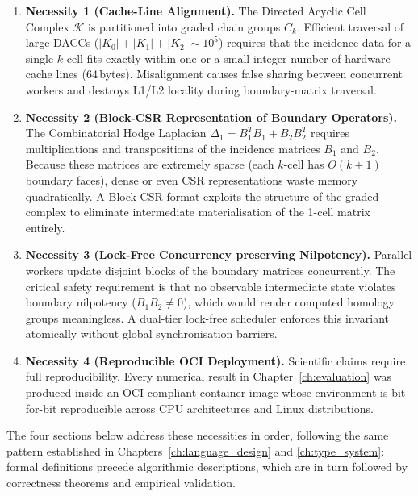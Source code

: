 \begin{enumerate}[leftmargin=1.5cm]
    \item \textbf{Necessity 1 (Cache-Line Alignment).}
          The Directed Acyclic Cell Complex $\mathcal{K}$ is partitioned into
          graded chain groups $C_k$.  Efficient traversal of large DACCs
          ($|K_0| + |K_1| + |K_2| \sim 10^5$) requires that the incidence
          data for a single $k$-cell fits exactly within one or a small
          integer number of hardware cache lines (64\,bytes).  Misalignment
          causes false sharing between concurrent workers and destroys
          L1/L2 locality during boundary-matrix traversal.

    \item \textbf{Necessity 2 (Block-CSR Representation of Boundary Operators).}
          The Combinatorial Hodge Laplacian
          $\Delta_1 = B_1^T B_1 + B_2 B_2^T$ requires multiplications and
          transpositions of the incidence matrices $B_1$ and $B_2$.  Because
          these matrices are extremely sparse (each $k$-cell has $O(k+1)$
          boundary faces), dense or even CSR representations waste memory
          quadratically.  A Block-CSR format exploits the structure of the
          graded complex to eliminate intermediate materialisation of the
          1-cell matrix entirely.

    \item \textbf{Necessity 3 (Lock-Free Concurrency preserving Nilpotency).}
          Parallel workers update disjoint blocks of the boundary matrices
          concurrently.  The critical safety requirement is that no observable
          intermediate state violates boundary nilpotency
          ($B_1 B_2 \ne 0$), which would render computed homology groups
          meaningless.  A dual-tier lock-free scheduler enforces this
          invariant atomically without global synchronisation barriers.

    \item \textbf{Necessity 4 (Reproducible OCI Deployment).}
          Scientific claims require full reproducibility.  Every numerical
          result in Chapter~\ref{ch:evaluation} was produced inside an
          OCI-compliant container image whose environment is bit-for-bit
          reproducible across CPU architectures and Linux distributions.
\end{enumerate}

The four sections below address these necessities in order, following the
same pattern established in Chapters~\ref{ch:language_design} and
\ref{ch:type_system}: formal definitions precede algorithmic descriptions,
which are in turn followed by correctness theorems and empirical validation.

